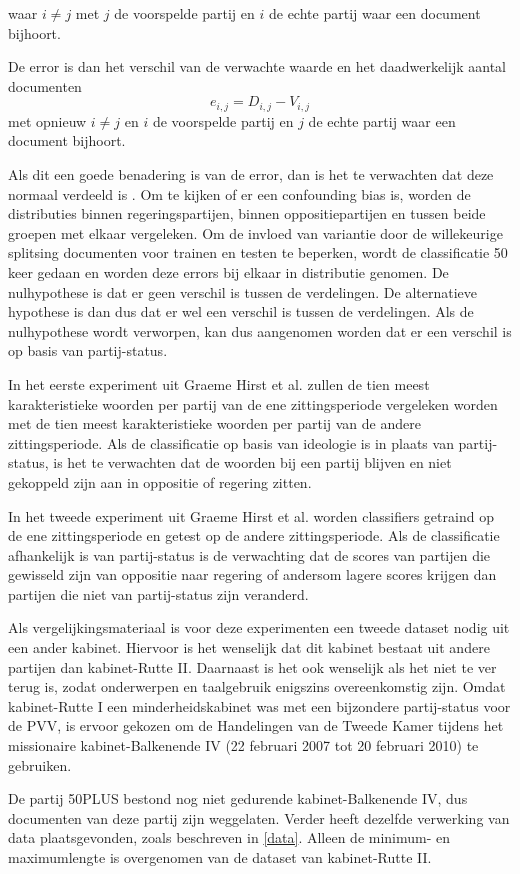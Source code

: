 waar $i\neq j$ met $j$ de voorspelde partij en $i$ de echte partij waar een document bijhoort.\par
De error is dan het verschil van de verwachte waarde en het daadwerkelijk aantal documenten
\begin{equation}
\label{eq:error}
e_{i,j} = D_{i,j} - V_{i,j}
\end{equation}
met opnieuw $i\neq j$ en $i$ de voorspelde partij en $j$ de echte partij waar een document bijhoort. \par
Als dit een goede benadering is van de error, dan is het te verwachten dat deze normaal verdeeld is \cite{citeulike:7531484}. Om te kijken of er een confounding bias is, worden de distributies binnen regeringspartijen, binnen oppositiepartijen en tussen beide groepen met elkaar vergeleken. Om de invloed van variantie door de willekeurige splitsing documenten voor trainen en testen te beperken, wordt de classificatie 50 keer gedaan en worden deze errors bij elkaar in distributie genomen. De nulhypothese is dat er geen verschil is tussen de verdelingen. De alternatieve hypothese is dan dus dat er wel een verschil is tussen de verdelingen. Als de nulhypothese wordt verworpen, kan dus aangenomen worden dat er een verschil is op basis van partij-status.\par
In het eerste experiment uit Graeme Hirst et al. zullen de tien meest karakteristieke woorden per partij van de ene zittingsperiode vergeleken worden met de tien meest karakteristieke woorden per partij van de andere zittingsperiode. Als de classificatie op basis van ideologie is in plaats van partij-status, is het te verwachten dat de woorden bij een partij blijven en niet gekoppeld zijn aan in oppositie of regering zitten. \par
In het tweede experiment uit Graeme Hirst et al. worden classifiers getraind op de ene zittingsperiode en getest op de andere zittingsperiode. Als de classificatie afhankelijk is van partij-status is de verwachting dat de scores van partijen die gewisseld zijn van oppositie naar regering of andersom lagere scores krijgen dan partijen die niet van partij-status zijn veranderd.\par
Als vergelijkingsmateriaal is voor deze experimenten een tweede dataset nodig uit een ander kabinet. Hiervoor is het wenselijk dat dit kabinet bestaat uit andere partijen dan kabinet-Rutte II. Daarnaast is het ook wenselijk als het niet te ver terug is, zodat onderwerpen en taalgebruik enigszins overeenkomstig zijn. Omdat kabinet-Rutte I een minderheidskabinet was met een bijzondere partij-status voor de PVV, is ervoor gekozen om de Handelingen van de Tweede Kamer tijdens het missionaire kabinet-Balkenende IV (22 februari 2007 tot 20 februari 2010) te gebruiken.\par
De partij 50PLUS bestond nog niet gedurende kabinet-Balkenende IV, dus documenten van deze partij zijn weggelaten. Verder heeft dezelfde verwerking van data plaatsgevonden, zoals beschreven in \ref{data}. Alleen de minimum- en maximumlengte is overgenomen van de dataset van kabinet-Rutte II.\par

